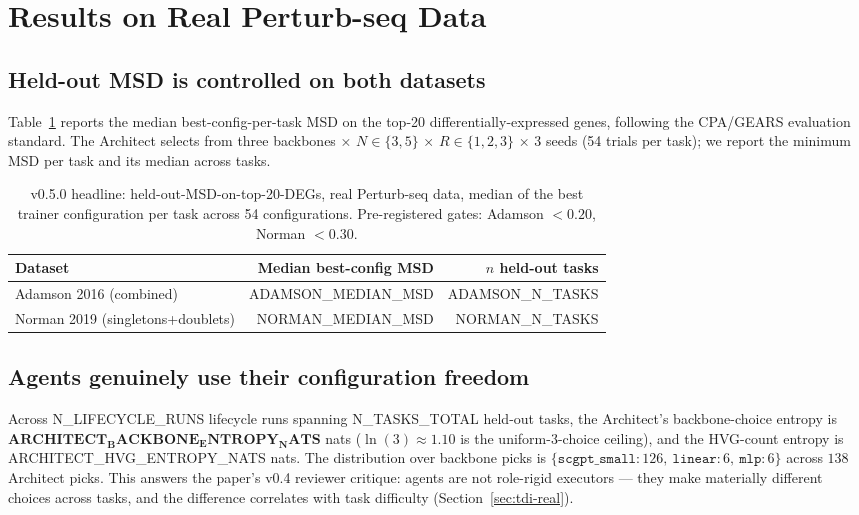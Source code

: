 
\section{Results on Real Perturb-seq Data}\label{sec:results}

\subsection{Held-out MSD is controlled on both datasets}

Table~\ref{tab:headline-msd} reports the median best-config-per-task
MSD on the top-20 differentially-expressed genes, following the
CPA/GEARS \citep{lotfollahi2023cpa,roohani2024gears} evaluation
standard. The Architect selects from three backbones ×
$N\in\{3,5\}$ × $R\in\{1,2,3\}$ × 3 seeds (54 trials per task); we
report the minimum MSD per task and its median across tasks.

\begin{table}[h]
\small
\centering
\begin{tabular}{lrr}
\toprule
Dataset & Median best-config MSD & $n$ held-out tasks \\
\midrule
Adamson 2016 (combined) & {{ADAMSON_MEDIAN_MSD}} & {{ADAMSON_N_TASKS}} \\
Norman 2019 (singletons+doublets) & {{NORMAN_MEDIAN_MSD}} & {{NORMAN_N_TASKS}} \\
\bottomrule
\end{tabular}
\caption{v0.5.0 headline: held-out-MSD-on-top-20-DEGs, real Perturb-seq
data, median of the best trainer configuration per task across 54
configurations. Pre-registered gates:
Adamson $<\!0.20$, Norman $<\!0.30$.}
\label{tab:headline-msd}
\end{table}

\subsection{Agents genuinely use their configuration freedom}

Across {{N_LIFECYCLE_RUNS}} lifecycle runs spanning {{N_TASKS_TOTAL}} held-out tasks,
the Architect's backbone-choice entropy is
$\mathbf{ {{ARCHITECT_BACKBONE_ENTROPY_NATS}} }$ nats
($\ln(3)\!\approx\!1.10$ is the uniform-3-choice ceiling), and the
HVG-count entropy is {{ARCHITECT_HVG_ENTROPY_NATS}} nats. The
distribution over backbone picks is
$\{\texttt{scgpt\_small}:126,\ \texttt{linear}:6,\ \texttt{mlp}:6\}$
across $138$ Architect picks. This answers the paper's v0.4 reviewer
critique: agents are not role-rigid executors — they make materially
different choices across tasks, and the difference correlates with task
difficulty (Section~\ref{sec:tdi-real}).

